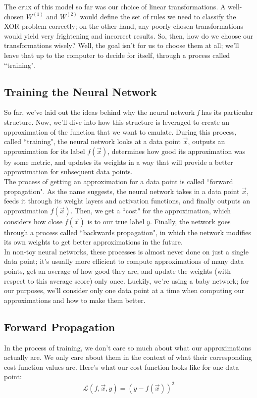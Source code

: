 \documentclass{article}
\begin{document}
The crux of this model so far was our choice of linear transformations. A well-chosen $W^{(1)}$ and $W^{(2)}$ would define the set of rules we need to classify the XOR problem correctly; on the other hand, any poorly-chosen transformations would yield very frightening and incorrect results. So, then, how do we choose our transformations wisely? Well, the goal isn't for us to choose them at all; we'll leave that up to the computer to decide for itself, through a process called ``training".

\subsection{Training the Neural Network}
So far, we've laid out the ideas behind why the neural network \textit{f} has its particular structure. Now, we'll dive into how this structure is leveraged to create an approximation of the function that we want to emulate. During this process, called ``training", the neural network looks at a data point $\vec{x}$, outputs an approximation for its label $f(\vec{x})$, determines how good its approximation was by some metric, and updates its weights in a way that will provide a better approximation for subsequent data points. \\

The process of getting an approximation for a data point is called ``forward propagation". As the name suggests, the neural network takes in a data point $\vec{x}$, feeds it through its weight layers and activation functions, and finally outputs an approximation $f(\vec{x})$. Then, we get a ``cost" for the approximation, which considers how close $f(\vec{x})$ is to our true label $y$. Finally, the network goes through a process called ``backwards propagation", in which the network modifies its own weights to get better approximations in the future. \\

In non-toy neural networks, these processes is almost never done on just a single data point; it's usually more efficient to compute approximations of many data points, get an average of how good they are, and update the weights (with respect to this average score) only once. Luckily, we're using a baby network; for our purposes, we'll consider only one data point at a time when computing our approximations and how to make them better. \\

\subsection{Forward Propagation}
In the process of training, we don't care so much about what our approximations actually are. We only care about them in the context of what their corresponding cost function values are. Here's what our cost function looks like for one data point: 
\[\mathcal{L}(f, \vec{x}, y) = \left(y - f(\vec{x})\right)^{2}\]
\end{document}
